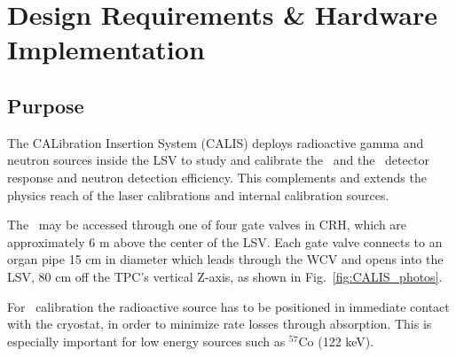 \section{Design Requirements \& Hardware Implementation} \label{sec:hardware}\label{sec:design_requirements}

\subsection{Purpose}
The CALibration Insertion System (CALIS) deploys radioactive gamma and neutron sources inside the LSV to study and calibrate the \tpc\ and the \lsv\ detector response and neutron detection efficiency. This complements and extends the physics reach of the laser calibrations and internal calibration sources. 

The \lsv\ may be accessed through one of four gate valves in CRH, which are approximately 6 m above the center of the LSV. Each gate valve connects to an organ pipe 15 cm in diameter which leads through the WCV and opens into the LSV, 80 cm off the TPC's vertical Z-axis, as shown in Fig.~\ref{fig:CALIS_photos}.

For \tpc\ calibration the radioactive source has to be positioned in immediate contact with the cryostat, in order to minimize rate losses through absorption. This is especially important for low energy sources such as $^{57}$Co (122 keV). 

